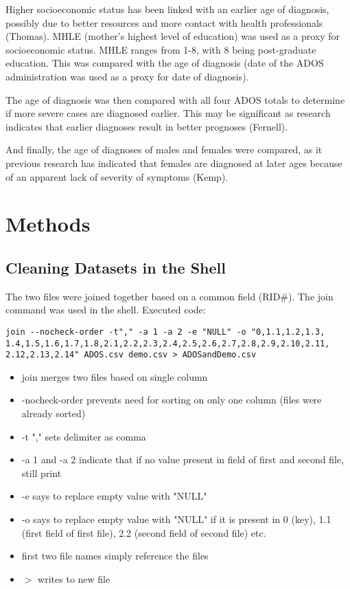 \documentclass{article}
\begin{document}
Higher socioeconomic status has been linked with an earlier age of diagnosis, possibly due to better resources and more contact with health professionals (Thomas). MHLE (mother's highest level of education) was used as a proxy for socioeconomic status. MHLE ranges from 1-8, with 8 being post-graduate education. This was compared with the age of diagnosis (date of the ADOS administration was used as a proxy for date of diagnosis).

The age of diagnosis was then compared with all four ADOS totals to determine if more severe cases are diagnosed earlier. This may be significant as research indicates that earlier diagnoses result in better prognoses (Fernell).

And finally, the age of diagnoses of males and females were compared, as it previous research has indicated that females are diagnosed at later ages because of an apparent lack of severity of symptoms (Kemp).

\section{Methods} %

\subsection{Cleaning Datasets in the Shell} %

The two files were joined together based on a common field (RID\#). The join command was used in the  shell. Executed code: 


\begin{verbatim}
join --nocheck-order -t"," -a 1 -a 2 -e "NULL" -o "0,1.1,1.2,1.3,
1.4,1.5,1.6,1.7,1.8,2.1,2.2,2.3,2.4,2.5,2.6,2.7,2.8,2.9,2.10,2.11,
2.12,2.13,2.14" ADOS.csv demo.csv > ADOSandDemo.csv
\end{verbatim}
\begin{itemize}
    \item [\textperiodcentered]join merges two files based on single column
    \item [\textperiodcentered]\--nocheck-order prevents need for sorting on only one column (files were already sorted)
    \item [\textperiodcentered]-t "," sets delimiter as comma
    \item [\textperiodcentered]-a 1 and -a 2  indicate that if no value present in field of first and second file, still print
    \item [\textperiodcentered]-e says to replace empty value with "NULL" 
    \item [\textperiodcentered]-o says to replace empty value with "NULL" if it is present in 0 (key), 1.1 (first field of first file), 2.2 (second field of second file) etc.
    \item [\textperiodcentered]first two file names simply reference the files
    \item [\textperiodcentered]$>$ writes to new file
\end{itemize}
\end{document}
